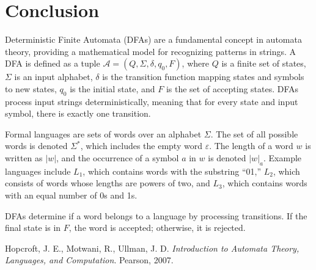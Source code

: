 \documentclass{article}
\begin{document}
\section{Conclusion}
\maketitle

Deterministic Finite Automata (DFAs) are a fundamental concept in automata theory, providing a mathematical model for recognizing patterns in strings. A DFA is defined as a tuple $\mathcal{A} = (Q, \Sigma, \delta, q_0, F)$, where $Q$ is a finite set of states, $\Sigma$ is an input alphabet, $\delta$ is the transition function mapping states and symbols to new states, $q_0$ is the initial state, and $F$ is the set of accepting states. DFAs process input strings deterministically, meaning that for every state and input symbol, there is exactly one transition.

Formal languages are sets of words over an alphabet $\Sigma$. The set of all possible words is denoted $\Sigma^*$, which includes the empty word $\varepsilon$. The length of a word $w$ is written as $|w|$, and the occurrence of a symbol $a$ in $w$ is denoted $|w|_a$. Example languages include $L_1$, which contains words with the substring “01,” $L_2$, which consists of words whose lengths are powers of two, and $L_3$, which contains words with an equal number of 0s and 1s.

DFAs determine if a word belongs to a language by processing transitions. If the final state is in $F$, the word is accepted; otherwise, it is rejected.

\newpage

\begin{thebibliography}{9}
 Hopcroft, J. E., Motwani, R., Ullman, J. D. \textit{Introduction to Automata Theory, Languages, and Computation}. Pearson, 2007.
\end{thebibliography}
\end{document}
